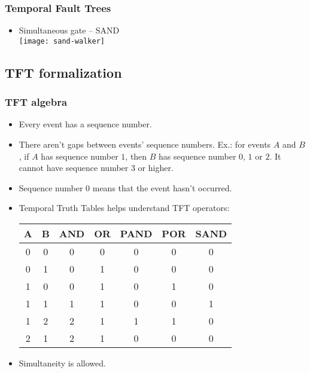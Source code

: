\begin{frame}
\frametitle{Temporal Fault Trees}
\begin{itemize}
  \item Simultaneous gate -- SAND\\
  \texttt{[image: sand-walker]}
\end{itemize}
\end{frame}

\subsection{TFT formalization}

\begin{frame}
\frametitle{TFT algebra}

\begin{itemize}
  \item Every event has a sequence number.
  \item There aren't gaps between events' sequence numbers. Ex.: for events $A$ and $B$, if $A$ has sequence number $1$, then $B$ has sequence number $0$, $1$ or $2$. It cannot have sequence number $3$ or higher.
  \item Sequence number $0$ means that the event hasn't occurred.
  \item Temporal Truth Tables helps understand TFT operators:
  {
  \scriptsize
  \begin{tabular}{c|c|c|c|c|c|c}
  A & B & AND & OR & PAND & POR & SAND\\
  \hline
  0 & 0 & 0 & 0 & 0 & 0 & 0\\
  \hline
  0 & 1 & 0 & 1 & 0 & 0 & 0\\
  \hline
  1 & 0 & 0 & 1 & 0 & 1 & 0\\
  \hline
  1 & 1 & 1 & 1 & 0 & 0 & 1\\
  \hline
  1 & 2 & 2 & 1 & 1 & 1 & 0\\
  \hline
  2 & 1 & 2 & 1 & 0 & 0 & 0\\
  \hline
  \end{tabular}
  }
  \item Simultaneity is allowed.
\end{itemize}

\end{frame}

